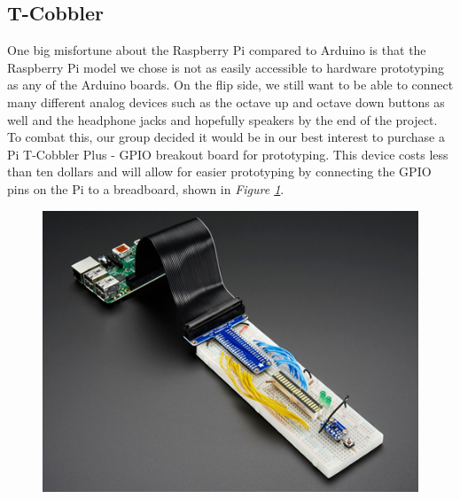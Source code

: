 \subsection{T-Cobbler}

One big misfortune about the Raspberry Pi compared to Arduino is that the Raspberry Pi model we chose is not as easily accessible to hardware prototyping as any of the Arduino boards. On the flip side, we still want to be able to connect many different analog devices such as the octave up and octave down buttons as well and the headphone jacks and hopefully speakers by the end of the project. To combat this, our group decided it would be in our best interest to purchase a Pi T-Cobbler Plus - GPIO breakout board for prototyping. This device costs less than ten dollars and will allow for easier prototyping by connecting the GPIO pins on the Pi to a breadboard, shown in \textit{Figure \ref{fig:tcobbler}}.

\begin{figure}[h!]
  \centering
  \includegraphics[width=\linewidth]{image/TCobbler.png}
  \caption{}
  \label{fig:tcobbler}
\end{figure}
\newpage
